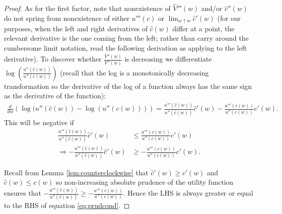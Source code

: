 \begin{proof}
	As for the first factor, note that nonexistence of 	$\hat{V}'''(w)$ and/or $\hat{c}''(w)$ do not spring from nonexistence of either $u'''(c)$ or $\lim_{w \uparrow w} \hat{c}'(w)$ (for our purposes, when the left and right derivatives of $\hat{c}(w)$ differ at a point, the relevant derivative is the one coming from the left; rather than carry around the cumbersome limit notation, read the following derivation as applying to the left derivative).  To discover whether $\frac{\hat {V}''(w)}{V''(w)}$ is decreasing we differentiate $\log\left(\frac{u''(\hat{c}(w))}{ u''(c(w))}\right)$ (recall that the log is a monotonically decreasing transformation so the derivative of the log of a function always has the same sign as the derivative of the function):
	\begin{align*}
	\frac{d}{d w}\left( \log(u''(\hat{c}(w)) - \log(u''(c(w)))\right) = \frac{u'''(\hat{c}(w))}{u''(\hat{c}(w))}\hat{c}'(w) -  \frac{u'''(c(w))}{u''(c(w))}c'(w).
	\end{align*}
	This will be negative if
	\begin{align}
	 \frac{u'''(\hat{c}(w))}{u''(\hat{c}(w))}\hat{c}'(w) & \leq  \frac{u'''(c(w))}{u''(c(w))}c'(w) \nonumber
	\\ \Rightarrow  -\frac{u'''(\hat{c}(w))}{u''(\hat{c}(w))}\hat{c}'(w) & \geq  -\frac{u'''(c(w))}{u''(c(w))} c'(w) \label{eq:prudcond} .
	\end{align}
	
	Recall from Lemma \ref{lem:counterclockwise} that $\hat{c}'(w) \geq c'(w)$ and $\hat{c}(w) \leq c(w)$ so non-increasing absolute prudence of the utility function ensures that $-\frac{u'''(\hat{c}(w))}{u''(\hat{c}(w))} \geq  -\frac{u'''(c(w))}{u''(c(w))}$. Hence the LHS is always greater or equal to the RHS of equation \eqref{eq:prudcond}.
	
\end{proof}



